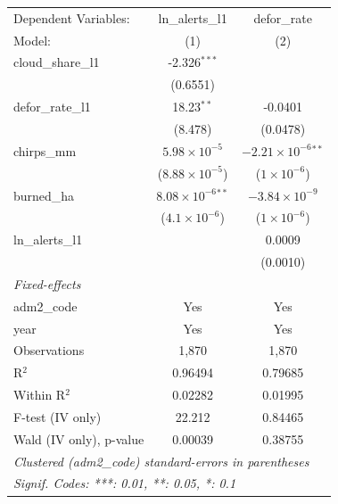 \begingroup
\centering
\begin{tabular}{lcc}
   \tabularnewline \midrule \midrule
   Dependent Variables:    & ln\_alerts\_l1               & defor\_rate\\   
   Model:                  & (1)                          & (2)\\  
   \midrule
   cloud\_share\_l1        & -2.326$^{***}$               &   \\   
                           & (0.6551)                     &   \\   
   defor\_rate\_l1         & 18.23$^{**}$                 & -0.0401\\   
                           & (8.478)                      & (0.0478)\\   
   chirps\_mm              & $5.98\times 10^{-5}$         & $-2.21\times 10^{-6}$$^{**}$\\    
                           & ($8.88\times 10^{-5}$)       & ($1\times 10^{-6}$)\\    
   burned\_ha              & $8.08\times 10^{-6}$$^{**}$  & $-3.84\times 10^{-9}$\\    
                           & ($4.1\times 10^{-6}$)        & ($1\times 10^{-6}$)\\    
   ln\_alerts\_l1          &                              & 0.0009\\   
                           &                              & (0.0010)\\   
   \midrule
   \emph{Fixed-effects}\\
   adm2\_code              & Yes                          & Yes\\  
   year                    & Yes                          & Yes\\  
   \midrule
   Observations            & 1,870                        & 1,870\\  
   R$^2$                   & 0.96494                      & 0.79685\\  
   Within R$^2$            & 0.02282                      & 0.01995\\  
   F-test (IV only)        & 22.212                       & 0.84465\\  
   Wald (IV only), p-value & 0.00039                      & 0.38755\\  
   \midrule \midrule
   \multicolumn{3}{l}{\emph{Clustered (adm2\_code) standard-errors in parentheses}}\\
   \multicolumn{3}{l}{\emph{Signif. Codes: ***: 0.01, **: 0.05, *: 0.1}}\\
\end{tabular}
\par\endgroup
